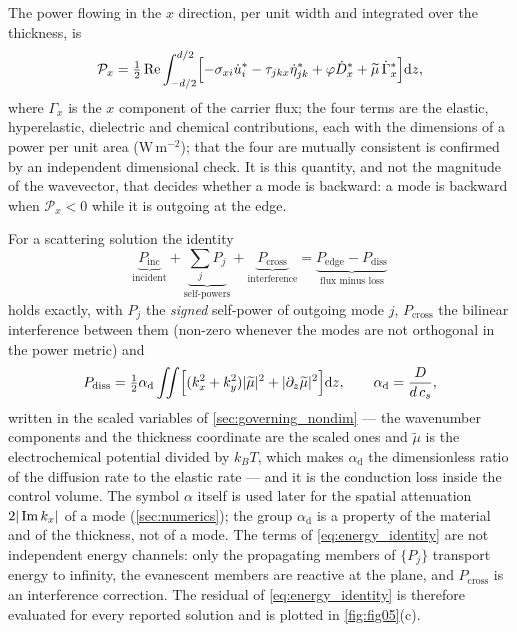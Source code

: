 The power flowing in the $x$ direction, per unit width and integrated over the
thickness, is
\begin{equation}
\label{eq:Px_int}
\mathcal{P}_x=\tfrac12\operatorname{Re}\int_{-d/2}^{d/2}
\Bigl[-\sigma_{xi}\dot u_i^{*}-\tau_{jkx}\dot\eta_{jk}^{*}
+\varphi\dot D_x^{*}+\widetilde\mu\,\dot\Gamma_x^{*}\Bigr]\mathrm{d} z ,
\end{equation}
where $\Gamma_x$ is the $x$ component of the carrier flux; the four terms are
the elastic, hyperelastic, dielectric and chemical contributions, each with the
dimensions of a power per unit area ($\mathrm{W\,m^{-2}}$); that the four are
mutually consistent is confirmed by an independent dimensional check.  It is this
quantity, and not the magnitude of the wavevector, that decides whether a mode
is backward: a mode is backward when $\mathcal{P}_x<0$ while it is outgoing at
the edge.

For a scattering solution the identity
\begin{equation}
\label{eq:energy_identity}
\underbrace{P_{\text{inc}}}_{\text{incident}}
+\underbrace{\sum_{j}P_j}_{\text{self-powers}}
+\underbrace{P_{\text{cross}}}_{\text{interference}}
=\underbrace{P_{\text{edge}}-P_{\text{diss}}}_{\text{flux minus loss}}
\end{equation}
holds exactly, with $P_j$ the \emph{signed} self-power of outgoing mode $j$,
$P_{\text{cross}}$ the bilinear interference between them (non-zero whenever the
modes are not orthogonal in the power metric) and
\begin{equation}
\label{eq:dissipation}
P_{\text{diss}}=\tfrac12\alpha_{\mathrm{d}}\iint
\Bigl[(k_x^2+k_y^2)|\widetilde\mu|^2+|\partial_z\widetilde\mu|^2\Bigr]\mathrm{d} z ,
\qquad \alpha_{\mathrm{d}}=\frac{D}{d\,c_s},
\end{equation}
written in the scaled variables of \cref{sec:governing_nondim} --- the wavenumber
components and the thickness coordinate are the scaled ones and
$\widetilde\mu$ is the electrochemical potential divided by $k_BT$, which makes
$\alpha_{\mathrm{d}}$ the dimensionless ratio of the diffusion rate to the
elastic rate --- and it is the conduction loss inside the control volume.  The
symbol $\alpha$ itself is used later for the spatial attenuation
$2|\operatorname{Im} k_x|$ of a mode (\cref{sec:numerics}); the group
$\alpha_{\mathrm{d}}$ is a property of the material and of the thickness, not of
a mode.  The terms of
\eqref{eq:energy_identity} are not independent energy channels: only the
propagating members of $\{P_j\}$ transport energy to infinity, the evanescent
members are reactive at the plane, and $P_{\text{cross}}$ is an interference
correction.  The residual of \eqref{eq:energy_identity} is therefore evaluated for every
reported solution and is plotted in \cref{fig:fig05}(c).

